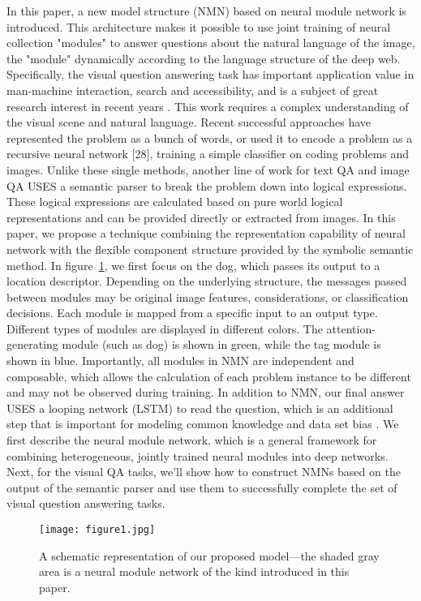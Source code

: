 \documentclass[a4paper,18pt]{article}
\begin{document}
In this paper, a new model structure (NMN) based on neural module network is introduced. This architecture makes it possible to use joint training of neural collection "modules" to answer questions about the natural language of the image, the "module" dynamically according to the language structure of the deep web. Specifically, the visual question answering task has important application value in man-machine interaction, search and accessibility, and is a subject of great research interest in recent years \cite{Antol_2015_Vqa}. This work requires a complex understanding of the visual scene and natural language. Recent successful approaches have represented the problem as a bunch of words, or used it to encode a problem as a recursive neural network [28], training a simple classifier on coding problems and images. Unlike these single methods, another line of work for text QA and image QA USES a semantic parser to break the problem down into logical expressions. These logical expressions are calculated based on pure world logical representations and can be provided directly or extracted from images\cite{Krishnamurthyi_2013_Jointly}. In this paper, we propose a technique combining the representation capability of neural network with the flexible component structure provided by the symbolic semantic method. In figure~\ref{pic1}, we first focus on the dog, which passes its output to a location descriptor. Depending on the underlying structure, the messages passed between modules may be original image features, considerations, or classification decisions. Each module is mapped from a specific input to an output type. Different types of modules are displayed in different colors. The attention-generating module (such as dog) is shown in green, while the tag module is shown in blue. Importantly, all modules in NMN are independent and composable, which allows the calculation of each problem instance to be different and may not be observed during training. In addition to NMN, our final answer USES a looping network (LSTM) to read the question, which is an additional step that is important for modeling common knowledge and data set bias \cite{Malinowski_2015_Ask}. We first describe the neural module network, which is a general framework for combining heterogeneous, jointly trained neural modules into deep networks. Next, for the visual QA tasks, we'll show how to construct NMNs based on the output of the semantic parser and use them to successfully complete the set of visual question answering tasks.
	\begin{figure}[htp]
	\centering
	\texttt{[image: figure1.jpg]}
	\caption{   A schematic representation of our proposed model—the
		shaded gray area is a neural module network of the kind introduced
		in this paper. 
 }\label{pic1}
\end{figure}
\end{document}
